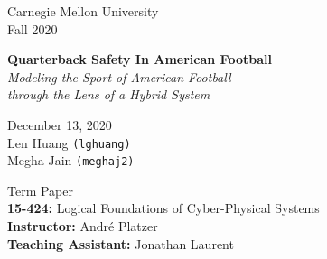 


\begin{titlepage} %

	
\begin{minipage}{0.8\textwidth} %
    \begin{flushleft} %
    \large
    Carnegie Mellon University\\ %
    Fall 2020\\ %
    \end{flushleft}
\end{minipage}
	
\vspace*{2in} %
	
\center %

	
{\Huge\bfseries Quarterback Safety In American Football}\\[0.4cm] %
{\huge \textit{Modeling the Sport of American Football \\ through the Lens of a Hybrid System}}\\

\vfill

{\large December 13, 2020}\\[0.4cm] %
Len Huang \texttt{(lghuang)}\\ %
Megha Jain \texttt{(meghaj2)}\\

\vfill

{ \large Term Paper } \\
\textbf{15-424:} Logical Foundations of Cyber-Physical Systems\\ %
\textbf{Instructor:} Andr\'e Platzer\\
\textbf{Teaching Assistant:} Jonathan Laurent
	
\vfill %


	

	
\end{titlepage}
